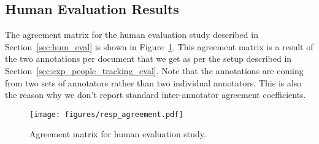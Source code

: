 \documentclass[11pt,a4paper]{article}
\begin{document}
\subsection{Human Evaluation Results}
\label{sec:app_hum_eval_res}
The agreement matrix for the human evaluation study described in Section~\ref{sec:hum_eval} is shown in Figure~\ref{fig:agreement}.
This agreement matrix is a result of the two annotations per document that we get as per the setup described in Section~\ref{sec:exp_people_tracking_eval}.
Note that the annotations are coming from two sets of annotators rather than two individual annotators. This is also the reason why we don't report standard inter-annotator agreement coefficients.
\begin{figure}[h]
    \centering
    \texttt{[image: figures/resp\_agreement.pdf]}
    \caption{Agreement matrix for human evaluation study.}
    \label{fig:agreement}
\end{figure}
\end{document}

